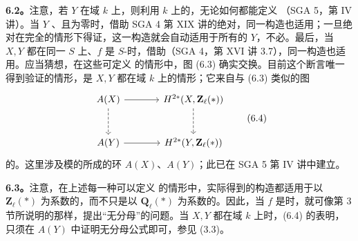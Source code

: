 \textbf{6.2。}注意，若 $Y$ 在域 $k$ 上，则利用 $k$ 上的，无论如何都能定义 （SGA 5，第 IV 讲）。当 $Y$ 、且为零时，借助 SGA 4 第 XIX 讲的绝对，同一构造也适用；一旦绝对在完全的情形下得证，这一构造就会自动适用于所有的 $Y$，不必。最后，当 $X,Y$ 都在同一 $S$ 上、$f$ 是 $S$-时，借助（SGA 4，第 XVI 讲 3.7），同一构造也适用。应当猜想，在这些可定义 的情形中，图 (6.3) 确实交换。目前这个断言唯一得到验证的情形，是 $X,Y$ 都在域 $k$ 上的情形；它来自与 (6.3) 类似的图
\[\begin{tikzcd}[column sep=large,row sep=large]
A(X)\arrow[r]\arrow[d,dashed]&H^{2*}(X,\mathbf Z_\ell(*))\arrow[d,dashed]\\
A(Y)\arrow[r]&H^{2*}(Y,\mathbf Z_\ell(*))
\end{tikzcd}\tag{6.4}\]
的。这里涉及模的所成的环 $A(X)$、$A(Y)$；此已在 SGA 5 第 IV 讲中建立。

\textbf{6.3。}注意，在上述每一种可以定义 的情形中，实际得到的构造都适用于以 $\mathbf Z_\ell(*)$ 为系数的，而不只是以 $\mathbf Q_\ell(*)$ 为系数的。因此，当 $f$ 是时，就可像第 3 节所说明的那样，提出“无分母”的问题。当 $X,Y$ 都在域 $k$ 上时，(6.4) 的表明，只须在  $A(Y)$ 中证明无分母公式即可，参见 (3.3)。

